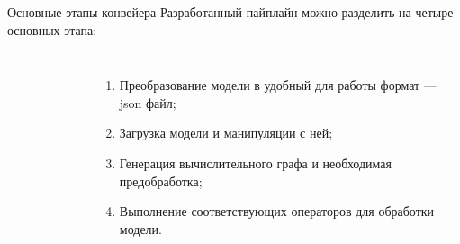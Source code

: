 \documentclass[aspectratio=169,xcolor=dvipsnames]{beamer}
\begin{document}
\begin{frame}{Основные этапы конвейера}
    Разработанный пайплайн можно разделить на четыре основных этапа:
    \begin{columns}[c] %

        \begin{figure}[h]
            \label{ris:ORTModelData}
        \end{figure}

        \begin{enumerate}
            \item Преобразование модели в удобный для работы формат — json файл;
            \item Загрузка модели и манипуляции с ней;
            \item Генерация вычислительного графа и необходимая предобработка;
            \item Выполнение соответствующих операторов для обработки модели.
        \end{enumerate}

    \end{columns}
\end{frame}
\end{document}
